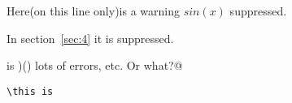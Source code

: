 Here(on this line only)is a warning $sin(x)$ suppressed. %

In section~\ref{sec:4} it is suppressed. %



\verb@\this is )() lots of errors, etc. Or what?@

\begin{verbatim}
\this is
\end{verbatim}


\[\]

